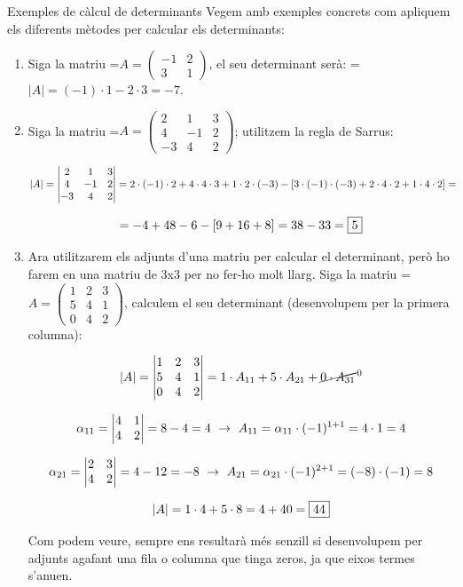 \documentclass[11pt,a4paper]{article}
\newcommand{\fmm}[1]{\setbox0=\hbox{$#1$}\ifdim\wd0>\linewidth\fmdisp{#1}\else\mbox{\box0}\fi}
\newcommand{\fmdisp}[1]{\[\setbox2=\hbox{$\displaystyle #1$}\ifdim\wd2>\linewidth\resizebox{\linewidth}{!}{\box2}\else\box2\fi\]}
\begin{document}
\begin{fmex}{Exemples de càlcul de determinants}
Vegem amb exemples concrets com apliquem els diferents mètodes per calcular els determinants:

\begin{enumerate}[label=\textbf{\arabic*.},leftmargin=*]
\item Siga la matriu \fmm{A=\begin{pmatrix}-1 & 2\\ 3 & 1\end{pmatrix}}, el seu determinant serà: \fmm{|A|=(-1)\cdot1-2\cdot3=-7}.
\item Siga la matriu \fmm{A=\begin{pmatrix}2 & 1 & 3\\ 4 & -1 & 2\\ -3 & 4 & 2\end{pmatrix}}; utilitzem la regla de Sarrus:

\fmdisp{|A|=\begin{vmatrix}2 & 1 & 3\\ 4 & -1 & 2\\ -3 & 4 & 2\end{vmatrix}=2\cdot(-1)\cdot2+4\cdot4\cdot3+1\cdot2\cdot(-3)-[3\cdot(-1)\cdot(-3)+2\cdot4\cdot2+1\cdot4\cdot2]=}

\fmdisp{=-4+48-6-[9+16+8]=38-33=\boxed{5}}

\item Ara utilitzarem els adjunts d'una matriu per calcular el determinant, però ho farem en una matriu de 3x3 per no fer-ho molt llarg.\newline
          Siga la matriu \fmm{A=\begin{pmatrix}1 & 2 & 3\\ 5 & 4 & 1\\ 0 & 4 & 2\end{pmatrix}}, calculem el seu determinant (desenvolupem per la primera columna):

\fmdisp{|A|=\begin{vmatrix}1 & 2 & 3\\ 5 & 4 & 1\\ 0 & 4 & 2\end{vmatrix}=1\cdot A_{11}+5\cdot A_{21}+\cancel{0\cdot A_{31}}^{\,0}}

\fmdisp{\alpha_{11}=\begin{vmatrix}4 & 1\\ 4 & 2\end{vmatrix}=8-4=4\ \rightarrow\ A_{11}=\alpha_{11}\cdot(-1)^{1+1}=4\cdot1=4}

\fmdisp{\alpha_{21}=\begin{vmatrix}2 & 3\\ 4 & 2\end{vmatrix}=4-12=-8\ \rightarrow\ A_{21}=\alpha_{21}\cdot(-1)^{2+1}=(-8)\cdot(-1)=8}

\fmdisp{|A|=1\cdot4+5\cdot8=4+40=\boxed{44}}

Com podem veure, sempre ens resultarà més senzill si desenvolupem per adjunts agafant una fila o columna que tinga zeros, ja que eixos termes s'anu\lgem{}en.
\end{enumerate}
\end{fmex}
\end{document}
